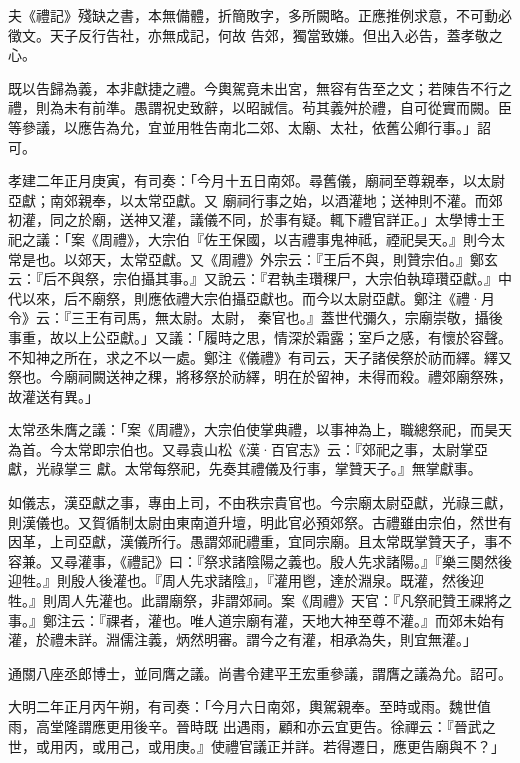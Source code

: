 \begin{pinyinscope}
 夫《禮記》殘缺之書，本無備體，折簡敗字，多所闕略。正應推例求意，不可動必徵文。天子反行告社，亦無成記，何故
 告郊，獨當致嫌。但出入必告，蓋孝敬之心。



 既以告歸為義，本非獻捷之禮。今輿駕竟未出宮，無容有告至之文；若陳告不行之禮，則為未有前準。愚謂祝史致辭，以昭誠信。茍其義舛於禮，自可從實而闕。臣等參議，以應告為允，宜並用牲告南北二郊、太廟、太社，依舊公卿行事。」詔可。



 孝建二年正月庚寅，有司奏：「今月十五日南郊。尋舊儀，廟祠至尊親奉，以太尉亞獻；南郊親奉，以太常亞獻。又
 廟祠行事之始，以酒灌地；送神則不灌。而郊初灌，同之於廟，送神又灌，議儀不同，於事有疑。輒下禮官詳正。」太學博士王祀之議：「案《周禮》，大宗伯『佐王保國，以吉禮事鬼神祗，禋祀昊天。』則今太常是也。以郊天，太常亞獻。又《周禮》外宗云：『王后不與，則贊宗伯。』鄭玄云：『后不與祭，宗伯攝其事。』又說云：『君執圭瓚稞尸，大宗伯執璋瓚亞獻。』中代以來，后不廟祭，則應依禮大宗伯攝亞獻也。而今以太尉亞獻。鄭注《禮·月令》云：『三王有司馬，無太尉。太尉，
 秦官也。』蓋世代彌久，宗廟崇敬，攝後事重，故以上公亞獻。」又議：「履時之思，情深於霜露；室戶之感，有懷於容聲。不知神之所在，求之不以一處。鄭注《儀禮》有司云，天子諸侯祭於祊而繹。繹又祭也。今廟祠闕送神之稞，將移祭於祊繹，明在於留神，未得而殺。禮郊廟祭殊，故灌送有異。」



 太常丞朱膺之議：「案《周禮》，大宗伯使掌典禮，以事神為上，職總祭祀，而昊天為首。今太常即宗伯也。又尋袁山松《漢·百官志》云：『郊祀之事，太尉掌亞獻，光祿掌三
 獻。太常每祭祀，先奏其禮儀及行事，掌贊天子。』無掌獻事。



 如儀志，漢亞獻之事，專由上司，不由秩宗貴官也。今宗廟太尉亞獻，光祿三獻，則漢儀也。又賀循制太尉由東南道升壇，明此官必預郊祭。古禮雖由宗伯，然世有因革，上司亞獻，漢儀所行。愚謂郊祀禮重，宜同宗廟。且太常既掌贊天子，事不容兼。又尋灌事，《禮記》曰：『祭求諸陰陽之義也。殷人先求諸陽。』『樂三闋然後迎牲。』則殷人後灌也。『周人先求諸陰』，『灌用鬯，達於淵泉。既灌，然後迎
 牲。』則周人先灌也。此謂廟祭，非謂郊祠。案《周禮》天官：『凡祭祀贊王祼將之事。』鄭注云：『祼者，灌也。唯人道宗廟有灌，天地大神至尊不灌。』而郊未始有灌，於禮未詳。淵儒注義，炳然明審。謂今之有灌，相承為失，則宜無灌。」



 通關八座丞郎博士，並同膺之議。尚書令建平王宏重參議，謂膺之議為允。詔可。



 大明二年正月丙午朔，有司奏：「今月六日南郊，輿駕親奉。至時或雨。魏世值雨，高堂隆謂應更用後辛。晉時既
 出遇雨，顧和亦云宜更告。徐禪云：『晉武之世，或用丙，或用己，或用庚。』使禮官議正并詳。若得遷日，應更告廟與不？」




\end{pinyinscope}
